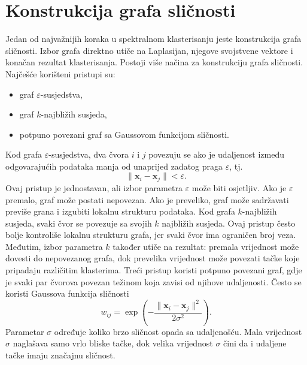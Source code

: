 \section{Konstrukcija grafa sličnosti}
Jedan od najvažnijih koraka u spektralnom klasterisanju jeste konstrukcija grafa sličnosti. Izbor grafa direktno utiče na Laplasijan, njegove svojstvene vektore i konačan rezultat klasterisanja.
Postoji više načina za konstrukciju grafa sličnosti. Najčešće korišteni pristupi su:
\begin{itemize}
    \item graf \(\varepsilon\)-susjedstva,
    \item graf \(k\)-najbližih susjeda,
    \item potpuno povezani graf sa Gaussovom funkcijom sličnosti.
\end{itemize}
Kod grafa \(\varepsilon\)-susjedstva, dva čvora \(i\) i \(j\) povezuju se ako je udaljenost između odgovarajućih podataka manja od unaprijed zadatog praga \(\varepsilon\), tj.
\[
    \|\mathbf{x}_i-\mathbf{x}_j\| < \varepsilon.
\]
Ovaj pristup je jednostavan, ali izbor parametra \(\varepsilon\) može biti osjetljiv. Ako je \(\varepsilon\) premalo, graf može postati nepovezan. Ako je preveliko, graf može sadržavati previše grana i izgubiti lokalnu strukturu podataka.
Kod grafa \(k\)-najbližih susjeda, svaki čvor se povezuje sa svojih \(k\) najbližih susjeda. Ovaj pristup često bolje kontroliše lokalnu strukturu grafa, jer svaki čvor ima ograničen broj veza. Međutim, izbor parametra \(k\) također utiče na rezultat: premala vrijednost može dovesti do nepovezanog grafa, dok prevelika vrijednost može povezati tačke koje pripadaju različitim klasterima.
Treći pristup koristi potpuno povezani graf, gdje je svaki par čvorova povezan težinom koja zavisi od njihove udaljenosti. Često se koristi Gaussova funkcija sličnosti
\[
    w_{ij}
    =
    \exp\left(
        -\frac{\|\mathbf{x}_i-\mathbf{x}_j\|^2}{2\sigma^2}
    \right).
\]
Parametar \(\sigma\) određuje koliko brzo sličnost opada sa udaljenošću. Mala vrijednost \(\sigma\) naglašava samo vrlo bliske tačke, dok velika vrijednost \(\sigma\) čini da i udaljene tačke imaju značajnu sličnost.

